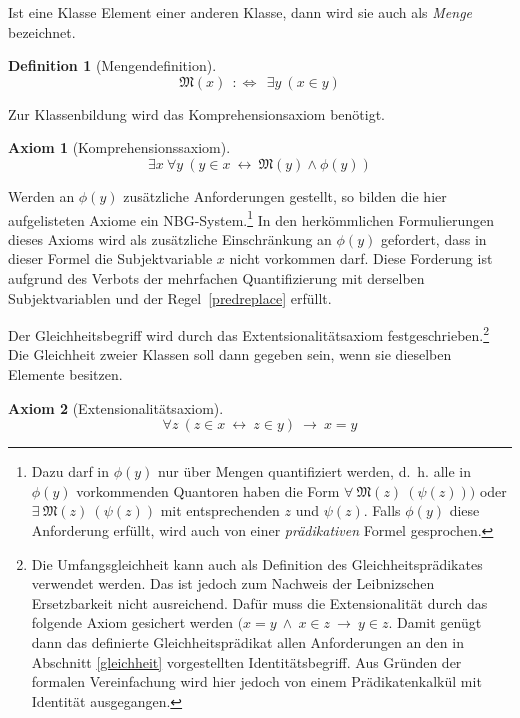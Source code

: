 \documentclass[a4paper,german,10pt,twoside]{book}
\newtheorem{ax}{Axiom}
\newtheorem{defn}{Definition}
\newcommand{\defp}{\ :\Leftrightarrow \ }
\newcommand{\impl}{\ \rightarrow \ }
\newcommand{\equi}{\ \leftrightarrow \ }
\newcommand{\isSet}[1]{\mathfrak{M}(#1)}
\begin{document}
{\par
Ist eine Klasse Element einer anderen Klasse, dann wird sie auch als \emph{Menge}
bezeichnet.
\begin{defn}[Mengendefinition]
$$ \isSet{x} \ \defp \ \exists y \ ( x \in y)$$
\end{defn}

Zur Klassenbildung wird das Komprehensionsaxiom
ben{\"o}tigt.
\begin{ax}[Komprehensionssaxiom]\label{kompax}
$$\exists x \ \forall y \ ( y \in x \equi \isSet{y} \land \phi(y))$$
\end{ax}
Werden an $\phi(y)$ zus{\"a}tzliche Anforderungen gestellt, so bilden die hier aufgelisteten Axiome ein
NBG-System.\footnote{Dazu darf in $\phi(y)$ nur {\"u}ber Mengen quantifiziert werden, d.~h. alle in
$\phi(y)$ vorkommenden Quantoren haben die Form $\forall \ \isSet{z} \ (\psi(z)))$ oder $\exists \
\isSet{z} \ (\psi(z))$ mit entsprechenden $z$ und $\psi(z)$. Falls $\phi(y)$ diese Anforderung
erf{\"u}llt, wird auch von einer \emph{pr{\"a}dikativen} Formel gesprochen.} In den herk{\"o}mmlichen
Formulierungen dieses Axioms wird als zus{\"a}tzliche Einschr{\"a}nkung an $\phi(y)$ gefordert, dass in
dieser Formel die Subjektvariable $x$ nicht vorkommen darf. Diese Forderung ist aufgrund des
Verbots der mehrfachen Quantifizierung mit derselben Subjektvariablen und der
Regel~\ref{predreplace} erf{\"u}llt.


Der Gleichheitsbegriff wird durch das
Extentsionalit{\"a}tsaxiom
festgeschrieben.\footnote{Die Umfangsgleichheit kann auch als Definition des Gleichheitspr{\"a}dikates
verwendet werden. Das ist jedoch zum Nachweis der Leibnizschen Ersetzbarkeit nicht ausreichend.
Daf{\"u}r muss die Extensionalit{\"a}t durch das folgende Axiom gesichert werden $(x = y ~ \land ~ x \in z
\impl y \in z$. Damit gen{\"u}gt dann das definierte Gleichheitspr{\"a}dikat allen Anforderungen an den in
Abschnitt \ref{gleichheit} vorgestellten Identit{\"a}tsbegriff. Aus Gr{\"u}nden der formalen Vereinfachung
wird hier jedoch von einem Pr{\"a}dikatenkalk{\"u}l mit Identit{\"a}t ausgegangen.} Die Gleichheit zweier
Klassen soll dann gegeben sein, wenn sie dieselben Elemente besitzen.
\begin{ax}[Extensionalit{\"a}tsaxiom]
$$\forall z \ (z \in x \equi z \in y) \impl x = y$$
\end{ax}

}
\end{document}
